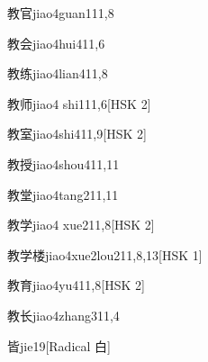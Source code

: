 \begin{entry}{教官}{jiao4guan1}{11,8}
\end{entry}

\begin{entry}{教会}{jiao4hui4}{11,6}
\end{entry}

\begin{entry}{教练}{jiao4lian4}{11,8}
\end{entry}

\begin{entry}{教师}{jiao4 shi1}{11,6}[HSK 2]
\end{entry}

\begin{entry}{教室}{jiao4shi4}{11,9}[HSK 2]
\end{entry}

\begin{entry}{教授}{jiao4shou4}{11,11}
\end{entry}

\begin{entry}{教堂}{jiao4tang2}{11,11}
\end{entry}

\begin{entry}{教学}{jiao4 xue2}{11,8}[HSK 2]
\end{entry}

\begin{entry}{教学楼}{jiao4xue2lou2}{11,8,13}[HSK 1]
\end{entry}

\begin{entry}{教育}{jiao4yu4}{11,8}[HSK 2]
\end{entry}

\begin{entry}{教长}{jiao4zhang3}{11,4}
\end{entry}

\begin{entry}{皆}{jie1}{9}[Radical 白]
\end{entry}

